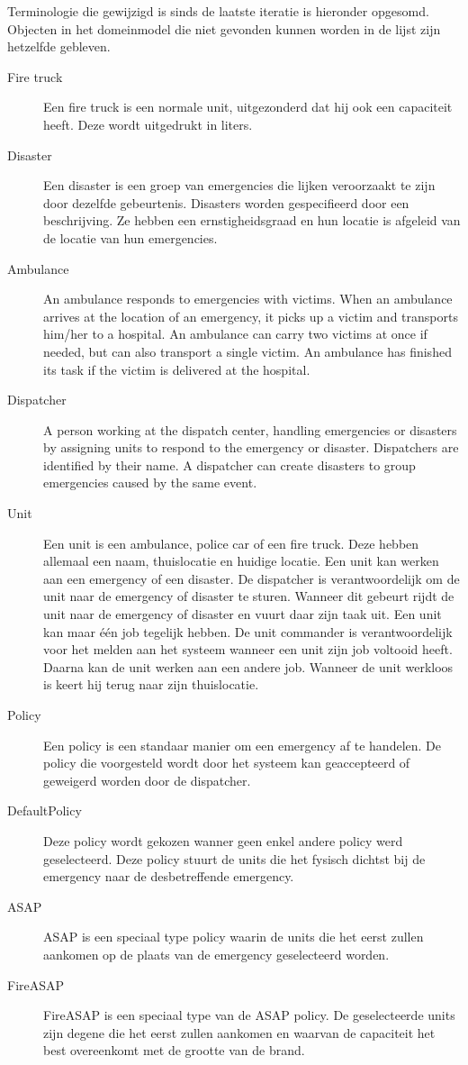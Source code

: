 \label{terminologie}
Terminologie die gewijzigd is sinds de laatste iteratie is hieronder opgesomd. Objecten in het domeinmodel die niet gevonden kunnen worden in de lijst zijn hetzelfde gebleven. 
\begin{description}
  \item[Fire truck] Een fire truck is een normale unit, uitgezonderd dat hij ook een capaciteit heeft. Deze wordt uitgedrukt in liters.
  \item[Disaster] Een disaster is een groep van emergencies die lijken veroorzaakt te zijn door dezelfde gebeurtenis. Disasters worden gespecifieerd door een beschrijving. Ze hebben een ernstigheidsgraad en hun locatie is afgeleid van de locatie van hun emergencies.
    \item[Ambulance] An ambulance responds to emergencies with victims. When an ambulance arrives at the location of an emergency, it picks up a victim and transports him/her to a hospital. An ambulance can carry two victims at once if needed, but can also transport a single victim. An ambulance has finished its task if the victim is delivered at the hospital. 
  \item[Dispatcher] A person working at the dispatch center, handling emergencies or disasters by assigning units to respond to the emergency or disaster. Dispatchers are identified by their name. A dispatcher can create disasters to group emergencies caused by the same event.
  \item[Unit] Een unit is een ambulance, police car of een fire truck. Deze hebben allemaal een naam, thuislocatie en huidige locatie. Een unit kan werken aan een emergency of een disaster. De dispatcher is verantwoordelijk om de unit naar de emergency of disaster te sturen. Wanneer dit gebeurt rijdt de unit naar de emergency of disaster en vuurt daar zijn taak uit. Een unit kan maar \'e\'en job tegelijk hebben. De unit commander is verantwoordelijk voor het melden aan het systeem wanneer een unit zijn job voltooid heeft. Daarna kan de unit werken aan een andere job. Wanneer de unit werkloos is keert hij terug naar zijn thuislocatie.
  \item[Policy]  Een policy is een standaar manier om een emergency af te handelen. De policy die voorgesteld wordt door het systeem kan geaccepteerd of geweigerd worden door de dispatcher.
  \item[DefaultPolicy] Deze policy wordt gekozen wanner geen enkel andere policy werd geselecteerd. Deze policy stuurt de units die het fysisch dichtst bij de emergency naar de desbetreffende emergency.
  \item[ASAP] ASAP is een speciaal type policy waarin de units die het eerst zullen aankomen op de plaats van de emergency geselecteerd worden.
  \item[FireASAP] FireASAP is een speciaal type van de ASAP policy. De geselecteerde units zijn degene die het eerst zullen aankomen en waarvan de capaciteit het best overeenkomt met de grootte van de brand.
\end{description}
